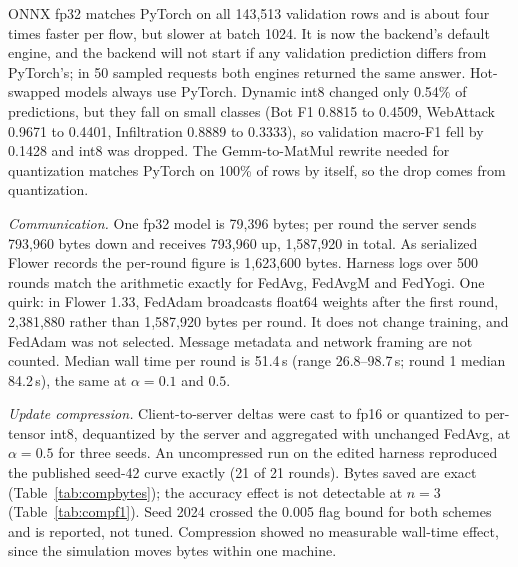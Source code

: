 ONNX fp32 matches PyTorch on all 143,513 validation rows and is about four times faster %
per flow, but slower at batch 1024. It is now the backend's default engine, and %
the backend will not start if any validation prediction differs from PyTorch's; in 50 %
sampled requests both engines returned the same answer. Hot-swapped models always use PyTorch. Dynamic int8 changed only 0.54\% of %
predictions, but they fall on small classes (Bot F1 0.8815 to 0.4509, WebAttack 0.9671 %
to 0.4401, Infiltration 0.8889 to 0.3333), so validation macro-F1 fell by 0.1428 and %
int8 was dropped. The Gemm-to-MatMul rewrite needed for quantization matches PyTorch on
100\% of rows by itself, so the drop comes from quantization. %

\emph{Communication.} One fp32 model is 79,396 bytes; per round the server sends 793,960 %
bytes down and receives 793,960 up, 1,587,920 in total. As serialized Flower records the %
per-round figure is 1,623,600 bytes. Harness logs over 500 rounds match the arithmetic %
exactly for FedAvg, FedAvgM and FedYogi. One quirk: in Flower 1.33, %
FedAdam broadcasts float64 weights after the first round, 2,381,880 rather than %
1,587,920 bytes per round. It does not change training, and FedAdam was not selected. %
Message metadata and network framing are not counted. Median wall time
per round is 51.4\,s (range 26.8--98.7\,s; round 1 median 84.2\,s), the same at %
$\alpha=0.1$ and $0.5$. %

\emph{Update compression.} Client-to-server deltas were cast to fp16 or quantized to
per-tensor int8, dequantized by the server and aggregated with unchanged FedAvg, at
$\alpha=0.5$ for three seeds. An uncompressed run on the edited harness reproduced the %
published seed-42 curve exactly (21 of 21 rounds). Bytes saved are exact %
(Table~\ref{tab:compbytes}); the accuracy effect is not detectable at $n=3$ %
(Table~\ref{tab:compf1}). Seed 2024 crossed the 0.005 flag bound for both schemes and %
is reported, not tuned. Compression showed no measurable wall-time effect, since the
simulation moves bytes within one machine.

